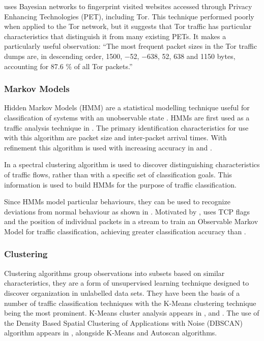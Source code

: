 \documentclass{ecuthesis}
\begin{document}
\textcite{Herrmann:2009p1189} uses Bayesian networks to fingerprint visited
websites accessed through Privacy Enhancing Technologies (PET), including Tor.
This technique performed poorly when applied to the Tor network, but it
suggests that Tor traffic has particular characteristics that distinguish it
from many existing PETs. It makes a particularly useful observation: ``The most
frequent packet sizes in the Tor traffic dumps are, in descending order, 1500,
−52, −638, 52, 638 and 1150 bytes, accounting for 87.6 \% of all Tor packets.''

\subsubsection{Markov Models}

Hidden Markov Models (HMM) are a statistical modelling technique useful
for classification of systems with an unobservable state
\parencite{Rabiner:1990p1153}. HMMs are first used as a traffic analysis
technique in  \parencite{Wright:2004p3860}. The
primary identification characteristics for use with this algorithm are packet
size and inter-packet arrival times. With refinement this algorithm is used
with increasing accuracy in \textcite{Wright:2006p322} and
\textcite{Dainotti:2008p1435}.

In \textcite{Bernaille:2005p6205} a spectral clustering algorithm is used to
discover distinguishing characteristics of traffic flows, rather than with a
specific set of classification goals. This information is used to build HMMs
for the purpose of traffic classification.

Since HMMs model particular behaviours, they can be used to recognize
deviations from normal behaviour as shown in
\textcite{EstevezTapiador:2003p7201}. Motivated by
\citeauthor{EstevezTapiador:2003p7201}, \textcite{Munz:2010p7085} uses TCP
flags and the position of individual packets in a stream to train an Observable
Markov Model for traffic classification, achieving greater classification
accuracy than \citeauthor{Bernaille:2005p6205}.

\subsubsection{Clustering}

Clustering algorithms group observations into subsets based on similar
characteristics, they are a form of unsupervised learning technique designed to
discover organization in unlabelled data sets. They have been the basis of a
number of traffic classification techniques with the K-Means clustering
technique being the most prominent.  K-Means cluster analysis appears in
\textcite{Bernaille:2006p2366}, \textcite{Erman:2007p3764} and
\textcite{Erman:2007p6206}. The use of the Density Based Spatial Clustering of
Applications with Noise (DBSCAN) algorithm appears in
\textcite{Erman:2006p3766}, alongside K-Means and Autoscan algorithms.
\end{document}
